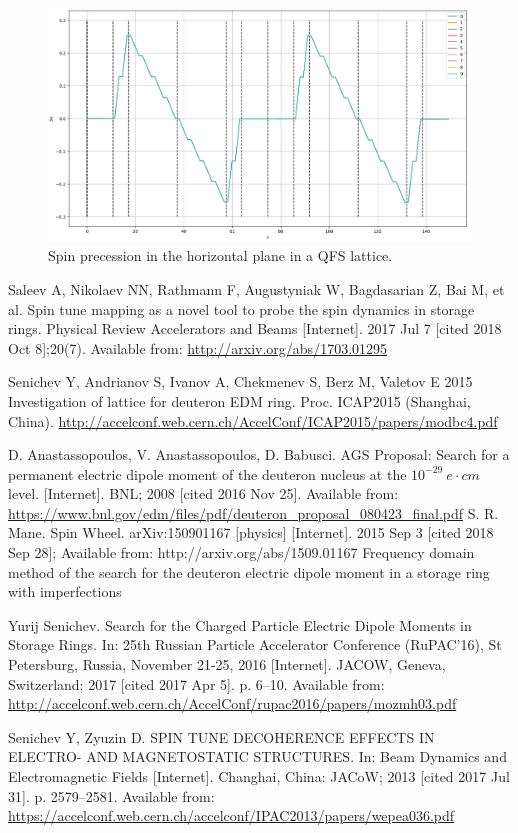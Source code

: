 \documentclass{article}
\begin{document}
\begin{figure}[h]
  \centering
  \includegraphics[width=\textwidth]{img/EB_QFS_Sx_vs_s_1turn}
  \caption{Spin precession in the horizontal plane in a QFS lattice.\label{fig:QFS_Sx_vs_s}}
\end{figure}


\begin{thebibliography}{99}
  Saleev A, Nikolaev NN, Rathmann F, Augustyniak W, Bagdasarian Z, Bai M, et al. Spin tune mapping as a novel tool to probe the spin dynamics in storage rings. Physical Review Accelerators and Beams [Internet]. 2017 Jul 7 [cited 2018 Oct 8];20(7). Available from: \url{http://arxiv.org/abs/1703.01295}
  
  Senichev Y, Andrianov S, Ivanov A, Chekmenev S, Berz M, Valetov E 2015 Investigation of lattice for deuteron EDM ring. Proc. ICAP2015 (Shanghai, China). \url{http://accelconf.web.cern.ch/AccelConf/ICAP2015/papers/modbc4.pdf}

  D. Anastassopoulos, V. Anastassopoulos, D. Babusci. AGS Proposal: Search for a permanent electric dipole moment of the deuteron nucleus at the $10^{−29} ~ e\cdot cm$ level. [Internet]. BNL; 2008 [cited 2016 Nov 25]. Available from: \url{https://www.bnl.gov/edm/files/pdf/deuteron_proposal_080423_final.pdf}
  S. R. Mane. Spin Wheel. arXiv:150901167 [physics] [Internet]. 2015 Sep 3 [cited 2018 Sep 28]; Available from: http://arxiv.org/abs/1509.01167
  Frequency domain method of the search for the deuteron electric dipole moment in a storage ring with imperfections

  Yurij Senichev. Search for the Charged Particle Electric Dipole Moments in Storage Rings. In: 25th Russian Particle Accelerator Conference (RuPAC’16), St Petersburg, Russia, November 21-25, 2016 [Internet]. JACOW, Geneva, Switzerland; 2017 [cited 2017 Apr 5]. p. 6–10. Available from: \url{http://accelconf.web.cern.ch/AccelConf/rupac2016/papers/mozmh03.pdf}

  Senichev Y, Zyuzin D. SPIN TUNE DECOHERENCE EFFECTS IN ELECTRO- AND  MAGNETOSTATIC STRUCTURES. In: Beam Dynamics and Electromagnetic Fields [Internet]. Changhai, China: JACoW; 2013 [cited 2017 Jul 31]. p. 2579--2581. Available from: \url{https://accelconf.web.cern.ch/accelconf/IPAC2013/papers/wepea036.pdf}

\end{thebibliography}
\end{document}
